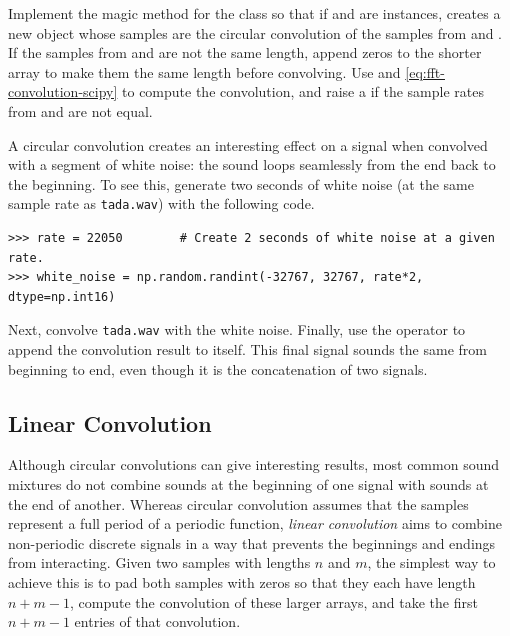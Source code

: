 \begin{problem} %
\item Implement the  magic method for the  class so that if  and  are  instances,  creates a new  object whose samples are the circular convolution of the samples from  and .
If the samples from  and  are not the same length, append zeros to the shorter array to make them the same length before convolving.
Use  and \eqref{eq:fft-convolution-scipy} to compute the convolution, and raise a  if the sample rates from  and  are not equal.

A circular convolution creates an interesting effect on a signal when convolved with a segment of white noise: the sound loops seamlessly from the end back to the beginning.
To see this, generate two seconds of white noise (at the same sample rate as \texttt{tada.wav}) with the following code.
\begin{lstlisting}
>>> rate = 22050        # Create 2 seconds of white noise at a given rate.
>>> white_noise = np.random.randint(-32767, 32767, rate*2, dtype=np.int16)
\end{lstlisting}
Next, convolve \texttt{tada.wav} with the white noise.
Finally, use the \li{>>} operator to append the convolution result to itself.
This final signal sounds the same from beginning to end, even though it is the concatenation of two signals.
\end{problem}

\subsection*{Linear Convolution} %

Although circular convolutions can give interesting results, most common sound mixtures do not combine sounds at the beginning of one signal with sounds at the end of another.
Whereas circular convolution assumes that the samples represent a full period of a periodic function, \emph{linear convolution} aims to combine non-periodic discrete signals in a way that prevents the beginnings and endings from interacting.
Given two samples with lengths $n$ and $m$, the simplest way to achieve this is to pad both samples with zeros so that they each have length $n+m-1$, compute the convolution of these larger arrays, and take the first $n+m-1$ entries of that convolution.

